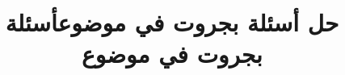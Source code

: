 \documentclass[14pt]{extarticle}
\title{حل أسئلة بجروت في موضوع}
\title{أسئلة بجروت في موضوع}
\begin{document}

\maketitle
\renewcommand{\contentsname}{جدول المحتويات}
\tableofcontents
\clearpage







\end{document}
